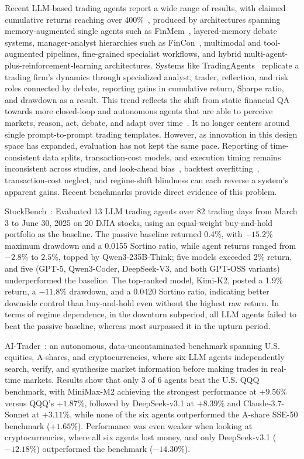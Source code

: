 \documentclass{article}
\begin{document}
Recent LLM-based trading agents report a wide range of results, with claimed cumulative returns reaching over 400\%~\cite{li2025hedgeagents}, produced by architectures spanning memory-augmented single agents such as FinMem~\cite{yu2023finmem}, layered-memory debate systems, manager-analyst hierarchies such as FinCon~\cite{yu2024fincon}, multimodal and tool-augmented pipelines, fine-grained specialist workflows, and hybrid multi-agent-plus-reinforcement-learning architectures. Systems like TradingAgents~\cite{xiao2024ta} replicate a trading firm's dynamics through specialized analyst, trader, reflection, and risk roles connected by debate, reporting gains in cumulative return, Sharpe ratio, and drawdown as a result. This trend reflects the shift from static financial QA towards more closed-loop and autonomous agents that are able to perceive markets, reason, act, debate, and adapt over time~\cite{chen2021finqa}. It no longer centers around single prompt-to-prompt trading templates. However, as innovation in this design space has expanded, evaluation has not kept the same pace. Reporting of time-consistent data splits, transaction-cost models, and execution timing remains inconsistent across studies, and look-ahead bias~\cite{lopezdeprado2018}, backtest overfitting~\cite{bailey2014}, transaction-cost neglect, and regime-shift blindness can each reverse a system's apparent gains. Recent benchmarks provide direct evidence of this problem.

StockBench~\cite{chen2025stockbench}: Evaluated 13 LLM trading agents over 82 trading days from March 3 to June 30, 2025 on 20 DJIA stocks, using an equal-weight buy-and-hold portfolio as the baseline. The passive baseline returned 0.4\%, with $-15.2\%$ maximum drawdown and a 0.0155 Sortino ratio, while agent returns ranged from $-2.8\%$ to $2.5\%$, topped by Qwen3-235B-Think; five models exceeded 2\% return, and five (GPT-5, Qwen3-Coder, DeepSeek-V3, and both GPT-OSS variants) underperformed the baseline. The top-ranked model, Kimi-K2, posted a 1.9\% return, a $-11.8\%$ drawdown, and a 0.0420 Sortino ratio, indicating better downside control than buy-and-hold even without the highest raw return. In terms of regime dependence, in the downturn subperiod, all LLM agents failed to beat the passive baseline, whereas most surpassed it in the upturn period.

AI-Trader~\cite{fan2025aitrader}: an autonomous, data-uncontaminated benchmark spanning U.S. equities, A-shares, and cryptocurrencies, where six LLM agents independently search, verify, and synthesize market information before making trades in real-time markets. Results show that only 3 of 6 agents beat the U.S. QQQ benchmark, with MiniMax-M2 achieving the strongest performance at $+9.56\%$ versus QQQ's $+1.87\%$, followed by DeepSeek-v3.1 at $+8.39\%$ and Claude-3.7-Sonnet at $+3.11\%$, while none of the six agents outperformed the A-share SSE-50 benchmark ($+1.65\%$). Performance was even weaker when looking at cryptocurrencies, where all six agents lost money, and only DeepSeek-v3.1 ($-12.18\%$) outperformed the benchmark ($-14.30\%$).
\end{document}
